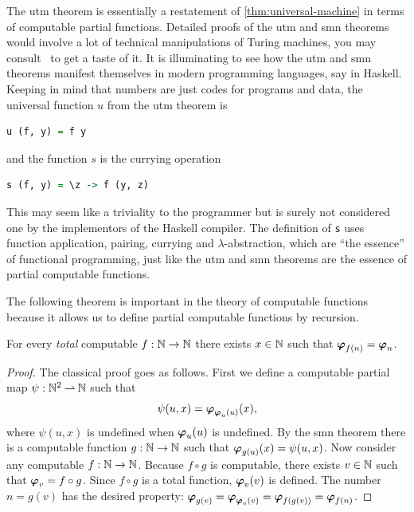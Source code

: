 \noindent
The utm theorem is essentially a restatement of
\cref{thm:universal-machine} in terms of computable partial
functions. Detailed proofs of the utm and smn theorems would involve
a lot of technical manipulations of Turing machines, you may consult~\cite{davis58:_comput_unsol} to get a taste of it.
It is illuminating to see how the utm and smn theorems manifest themselves in modern programming languages, say in Haskell. Keeping in mind that numbers are just codes for programs and data, the universal function $u$ from the utm theorem is
%
\begin{lstlisting}[language=Haskell]
u (f, y) = f y
\end{lstlisting}
%
and the function $s$ is the currying operation
%
\begin{lstlisting}[language=Haskell]
s (f, y) = \z -> f (y, z)
\end{lstlisting}
%
This may seem like a triviality to the programmer but is surely not
considered one by the implementors of the Haskell compiler. The definition of \lstinline!s! uses function application, pairing, currying and $\lambda$-abstraction, which are ``the essence'' of functional programming, just like the utm and smn theorems are the essence of partial computable functions.

The following theorem is important in the theory of computable
functions because it allows us to define partial computable functions
by recursion.

\begin{theorem}
  For every \emph{total} computable $f : \mathbb{N} \to \mathbb{N}$ there exists $x
  \in \mathbb{N}$ such that $\text{\boldmath{$\varphi$}}_{f(n)} = \text{\boldmath{$\varphi$}}_{n}$.
\end{theorem}

\begin{proof}
  The classical proof goes as follows. First we define a computable
  partial map $\psi : \mathbb{N}^2 \mathbin{\rightharpoonup} \mathbb{N}$ such that
  \begin{equation*}
    \psi(u, x) = \text{\boldmath{$\varphi$}}_{\text{\boldmath{$\varphi$}}_{u}(u)}(x),
  \end{equation*}
  where $\psi(u, x)$ is undefined when $\text{\boldmath{$\varphi$}}_{u}(u)$ is undefined.
  By the smn theorem there is a computable function $g : \mathbb{N} \to \mathbb{N}$
  such that $\text{\boldmath{$\varphi$}}_{g(u)}(x) = \psi(u, x)$. Now consider any computable
  $f : \mathbb{N} \to \mathbb{N}$. Because $f \circ g$ is computable, there exists
  $v \in \mathbb{N}$ such that $\text{\boldmath{$\varphi$}}_{v} = f \circ g$. Since $f \circ g$ is a
  total function, $\text{\boldmath{$\varphi$}}_{v}(v)$ is defined. The number $n = g(v)$ has
  the desired property:
  $\text{\boldmath{$\varphi$}}_{g(v)} = \text{\boldmath{$\varphi$}}_{\text{\boldmath{$\varphi$}}_{v}(v)} = \text{\boldmath{$\varphi$}}_{f(g(v))} = \text{\boldmath{$\varphi$}}_{f(n)}$.
\end{proof}

